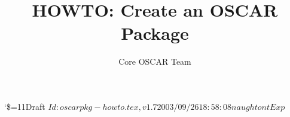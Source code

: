 \documentclass[letterpaper]{article}
\title{HOWTO: Create an OSCAR Package}
\author{Core OSCAR Team}
\begin{document}
\maketitle

\begin{center}
  {\catcode`\$=11\tiny\noindent Draft $Id: oscarpkg-howto.tex,v 1.7 2003/09/26 18:58:08 naughtont Exp $}
\end{center}
















%
%


%
%
\newpage   %
\appendix








%
\end{document}
